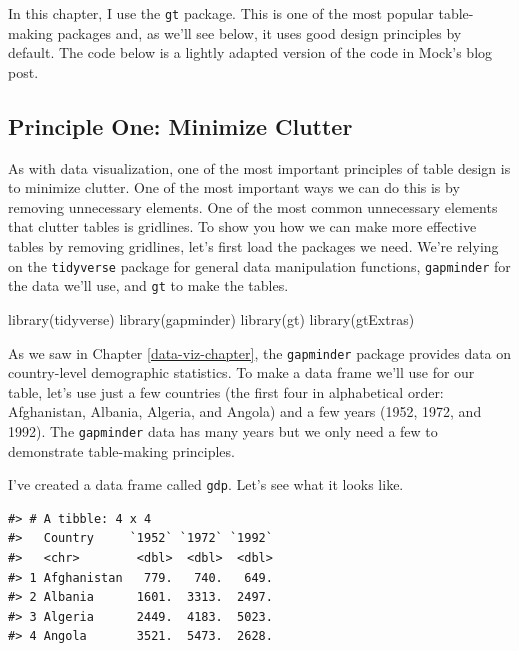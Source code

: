 \documentclass[
]{book}
\newenvironment{Shaded}{\begin{snugshade}}{\end{snugshade}}
\newcommand{\FunctionTok}[1]{\textcolor[rgb]{0.00,0.00,0.00}{#1}}
\newcommand{\NormalTok}[1]{#1}
\begin{document}
In this chapter, I use the \texttt{gt} package. This is one of the most popular table-making packages and, as we'll see below, it uses good design principles by default. The code below is a lightly adapted version of the code in Mock's blog post.

\hypertarget{principle-one-minimize-clutter}{%
\subsection*{Principle One: Minimize Clutter}\label{principle-one-minimize-clutter}}

As with data visualization, one of the most important principles of table design is to minimize clutter. One of the most important ways we can do this is by removing unnecessary elements. One of the most common unnecessary elements that clutter tables is gridlines. To show you how we can make more effective tables by removing gridlines, let's first load the packages we need. We're relying on the \texttt{tidyverse} package for general data manipulation functions, \texttt{gapminder} for the data we'll use, and \texttt{gt} to make the tables.

\begin{Shaded}
\begin{Highlighting}[]
\FunctionTok{library}\NormalTok{(tidyverse)}
\FunctionTok{library}\NormalTok{(gapminder)}
\FunctionTok{library}\NormalTok{(gt)}
\FunctionTok{library}\NormalTok{(gtExtras)}
\end{Highlighting}
\end{Shaded}

As we saw in Chapter \ref{data-viz-chapter}, the \texttt{gapminder} package provides data on country-level demographic statistics. To make a data frame we'll use for our table, let's use just a few countries (the first four in alphabetical order: Afghanistan, Albania, Algeria, and Angola) and a few years (1952, 1972, and 1992). The \texttt{gapminder} data has many years but we only need a few to demonstrate table-making principles.

I've created a data frame called \texttt{gdp}. Let's see what it looks like.

\begin{verbatim}
#> # A tibble: 4 x 4
#>   Country     `1952` `1972` `1992`
#>   <chr>        <dbl>  <dbl>  <dbl>
#> 1 Afghanistan   779.   740.   649.
#> 2 Albania      1601.  3313.  2497.
#> 3 Algeria      2449.  4183.  5023.
#> 4 Angola       3521.  5473.  2628.
\end{verbatim}
\end{document}
